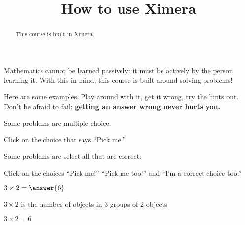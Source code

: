 \documentclass{ximera}
\title{How to use Ximera}
\begin{document}
\begin{abstract}
  This course is built in Ximera.
\end{abstract}\maketitle

Mathematics cannot be learned passively: it must be actively
by the person learning it.  With this in mind, this course is built
around solving problems!

Here are some examples.  Play around with it, get it wrong, try the
hints out.  Don't be afraid to fail: \textbf{getting an answer wrong
  never hurts you.}


\begin{example}
  Some problems are multiple-choice:
  \begin{multipleChoice}
  \end{multipleChoice}
  \begin{hint}
    Click on the choice that says ``Pick me!''
  \end{hint}
\end{example}


\begin{example}
  Some problems are select-all that are correct:
  \begin{selectAll}
  \end{selectAll}
  \begin{hint}
    Click on the choices ``Pick me!'' ``Pick me too!'' and ``I'm a correct choice too.''
  \end{hint}
\end{example}


\begin{example}
  $3\times 2 = \answer{6}$   
  \begin{hint}
    $3 \times 2$ is the number of objects in $3$ groups of $2$ objects
  \end{hint}
  \begin{hint}
    \begin{image}
    \end{image}
  \end{hint}
  \begin{hint}
    $3\times 2=6$
  \end{hint}
\end{example}
\end{document}
